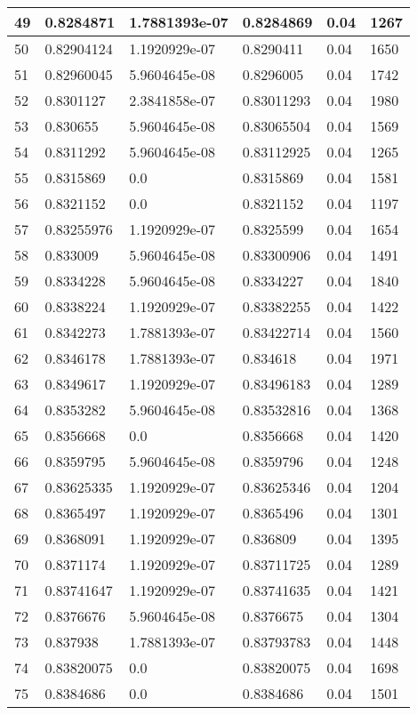 \begin{longtable}{|l|l|l|l|l|l|}
49 & 0.8284871 & 1.7881393e-07 & 0.8284869 & 0.04 & 1267 \\ \hline 
50 & 0.82904124 & 1.1920929e-07 & 0.8290411 & 0.04 & 1650 \\ \hline 
51 & 0.82960045 & 5.9604645e-08 & 0.8296005 & 0.04 & 1742 \\ \hline 
52 & 0.8301127 & 2.3841858e-07 & 0.83011293 & 0.04 & 1980 \\ \hline 
53 & 0.830655 & 5.9604645e-08 & 0.83065504 & 0.04 & 1569 \\ \hline 
54 & 0.8311292 & 5.9604645e-08 & 0.83112925 & 0.04 & 1265 \\ \hline 
55 & 0.8315869 & 0.0 & 0.8315869 & 0.04 & 1581 \\ \hline 
56 & 0.8321152 & 0.0 & 0.8321152 & 0.04 & 1197 \\ \hline 
57 & 0.83255976 & 1.1920929e-07 & 0.8325599 & 0.04 & 1654 \\ \hline 
58 & 0.833009 & 5.9604645e-08 & 0.83300906 & 0.04 & 1491 \\ \hline 
59 & 0.8334228 & 5.9604645e-08 & 0.8334227 & 0.04 & 1840 \\ \hline 
60 & 0.8338224 & 1.1920929e-07 & 0.83382255 & 0.04 & 1422 \\ \hline 
61 & 0.8342273 & 1.7881393e-07 & 0.83422714 & 0.04 & 1560 \\ \hline 
62 & 0.8346178 & 1.7881393e-07 & 0.834618 & 0.04 & 1971 \\ \hline 
63 & 0.8349617 & 1.1920929e-07 & 0.83496183 & 0.04 & 1289 \\ \hline 
64 & 0.8353282 & 5.9604645e-08 & 0.83532816 & 0.04 & 1368 \\ \hline 
65 & 0.8356668 & 0.0 & 0.8356668 & 0.04 & 1420 \\ \hline 
66 & 0.8359795 & 5.9604645e-08 & 0.8359796 & 0.04 & 1248 \\ \hline 
67 & 0.83625335 & 1.1920929e-07 & 0.83625346 & 0.04 & 1204 \\ \hline 
68 & 0.8365497 & 1.1920929e-07 & 0.8365496 & 0.04 & 1301 \\ \hline 
69 & 0.8368091 & 1.1920929e-07 & 0.836809 & 0.04 & 1395 \\ \hline 
70 & 0.8371174 & 1.1920929e-07 & 0.83711725 & 0.04 & 1289 \\ \hline 
71 & 0.83741647 & 1.1920929e-07 & 0.83741635 & 0.04 & 1421 \\ \hline 
72 & 0.8376676 & 5.9604645e-08 & 0.8376675 & 0.04 & 1304 \\ \hline 
73 & 0.837938 & 1.7881393e-07 & 0.83793783 & 0.04 & 1448 \\ \hline 
74 & 0.83820075 & 0.0 & 0.83820075 & 0.04 & 1698 \\ \hline 
75 & 0.8384686 & 0.0 & 0.8384686 & 0.04 & 1501 \\ \hline 
\end{longtable}